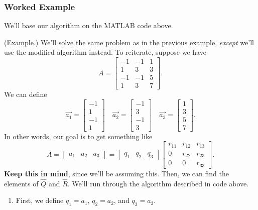 \documentclass[letterpaper]{article}
\begin{document}
\subsubsection{Worked Example}
We'll base our algorithm on the MATLAB code above. 
\begin{mdframed}
    (Example.) We'll solve the same problem as in the previous example, \emph{except} we'll use the modified algorithm instead. To reiterate, suppose we have \[A = \begin{bmatrix}
        -1 & -1 & 1 \\ 
        1 & 3 & 3 \\ 
        -1 & -1 & 5 \\ 
        1 & 3 & 7
    \end{bmatrix}.\]
    We can define 
    \[\vec{a_1} = \begin{bmatrix}
        -1 \\ 1 \\ -1 \\ 1
    \end{bmatrix} \quad \vec{a_2} = \begin{bmatrix}
        -1 \\ 3 \\ -1 \\ 3
    \end{bmatrix} \quad \vec{a_3} = \begin{bmatrix}
        1 \\ 3 \\ 5 \\ 7
    \end{bmatrix}.\]
    In other words, our goal is to get something like 
    \[A = \begin{bmatrix}
        a_1 & a_2 & a_3
    \end{bmatrix} = \begin{bmatrix}
        q_1 & q_2 & q_3
    \end{bmatrix} \begin{bmatrix}
        r_{11} & r_{12} & r_{13} \\ 
        0 & r_{22} & r_{23} \\ 
        0 & 0 & r_{33}
    \end{bmatrix}.\]
    \textbf{Keep this in mind}, since we'll be assuming this. Then, we can find the elements of $\hat{Q}$ and $\hat{R}$. We'll run through the algorithm described in code above. 
    \begin{enumerate}
        \item First, we define $q_1 = a_1$, $q_2 = a_2$, and $q_3 = a_3$. 
        

\end{enumerate}
\end{mdframed}
\end{document}
